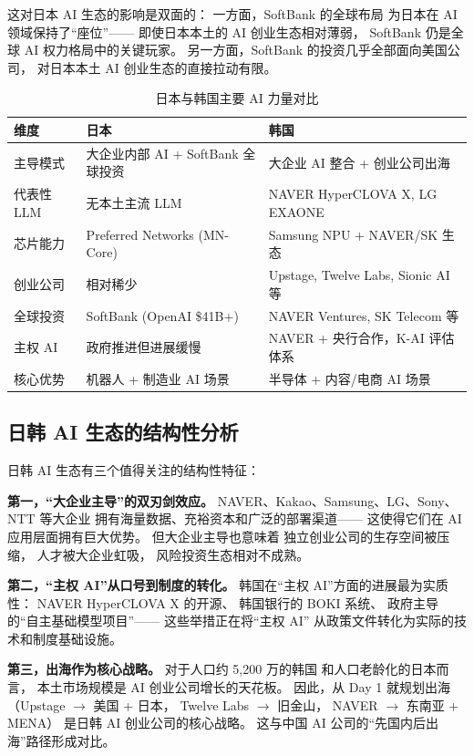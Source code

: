 这对日本 AI 生态的影响是双面的：
一方面，SoftBank 的全球布局
为日本在 AI 领域保持了``座位''——
即使日本本土的 AI 创业生态相对薄弱，
SoftBank 仍是全球 AI 权力格局中的关键玩家。
另一方面，SoftBank 的投资几乎全部面向美国公司，
对日本本土 AI 创业生态的直接拉动有限。

\begin{table}[htbp]
\centering
\caption{日本与韩国主要 AI 力量对比}
\label{tab:japan-korea-ai}
\small
\begin{tabularx}{\textwidth}{l X X}
\toprule
\rowcolor{figLightGray}
\textbf{维度} & \textbf{日本} & \textbf{韩国} \\
\midrule
主导模式    & 大企业内部 AI + SoftBank 全球投资
            & 大企业 AI 整合 + 创业公司出海 \\
代表性 LLM  & 无本土主流 LLM
            & NAVER HyperCLOVA X, LG EXAONE \\
芯片能力    & Preferred Networks (MN-Core)
            & Samsung NPU + NAVER/SK 生态 \\
创业公司    & 相对稀少
            & Upstage, Twelve Labs, Sionic AI 等 \\
全球投资    & SoftBank (OpenAI \$41B+)
            & NAVER Ventures, SK Telecom 等 \\
主权 AI     & 政府推进但进展缓慢
            & NAVER + 央行合作，K-AI 评估体系 \\
核心优势    & 机器人 + 制造业 AI 场景
            & 半导体 + 内容/电商 AI 场景 \\
\bottomrule
\end{tabularx}
\end{table}

\subsection{日韩 AI 生态的结构性分析}

日韩 AI 生态有三个值得关注的结构性特征：

\textbf{第一，``大企业主导''的双刃剑效应。}
NAVER、Kakao、Samsung、LG、Sony、NTT 等大企业
拥有海量数据、充裕资本和广泛的部署渠道——
这使得它们在 AI 应用层面拥有巨大优势。
但大企业主导也意味着
独立创业公司的生存空间被压缩，
人才被大企业虹吸，
风险投资生态相对不成熟。

\textbf{第二，``主权 AI''从口号到制度的转化。}
韩国在``主权 AI''方面的进展最为实质性：
NAVER HyperCLOVA X 的开源、
韩国银行的 BOKI 系统、
政府主导的``自主基础模型项目''——
这些举措正在将``主权 AI''
从政策文件转化为实际的技术和制度基础设施。

\textbf{第三，出海作为核心战略。}
对于人口约 5,200 万的韩国
和人口老龄化的日本而言，
本土市场规模是 AI 创业公司增长的天花板。
因此，从 Day 1 就规划出海
（Upstage $\to$ 美国 + 日本，
Twelve Labs $\to$ 旧金山，
NAVER $\to$ 东南亚 + MENA）
是日韩 AI 创业公司的核心战略。
这与中国 AI 公司的``先国内后出海''路径形成对比。

